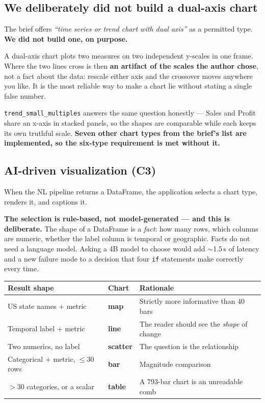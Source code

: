 \documentclass[11pt,a4paper]{article}
\begin{document}
\subsection{We deliberately did not build a dual-axis chart}
\label{sec:dual}

The brief offers \emph{``time series or trend chart with dual axis''} as a permitted
type. \textbf{We did not build one, on purpose.}

A dual-axis chart plots two measures on two independent y-scales in one frame. Where the
two lines cross is then \textbf{an artifact of the scales the author chose}, not a fact
about the data: rescale either axis and the crossover moves anywhere you like. It is the
most reliable way to make a chart lie without stating a single false number.

\texttt{trend\_small\_multiples} answers the same question honestly --- Sales and Profit
share an x-axis in stacked panels, so the shapes are comparable while each keeps its own
truthful scale. \textbf{Seven other chart types from the brief's list are implemented, so
the six-type requirement is met without it.}

\subsection{AI-driven visualization (C3)}

When the NL pipeline returns a DataFrame, the application selects a chart type, renders
it, and captions it.

\textbf{The selection is rule-based, not model-generated --- and this is deliberate.}
The shape of a DataFrame is a \emph{fact}: how many rows, which columns are numeric,
whether the label column is temporal or geographic. Facts do not need a language model.
Asking a 4B model to choose would add $\sim$1.5\,s of latency and a new failure mode to
a decision that four \texttt{if} statements make correctly every time.

\begin{center}
\begin{tabularx}{\textwidth}{@{}llX@{}}
\toprule
\textbf{Result shape} & \textbf{Chart} & \textbf{Rationale} \\
\midrule
US state names + metric            & \textbf{map}     & Strictly more informative than 40 bars \\
Temporal label + metric            & \textbf{line}    & The reader should see the \emph{shape} of change \\
Two numerics, no label             & \textbf{scatter} & The question is the relationship \\
Categorical + metric, $\le$30 rows & \textbf{bar}     & Magnitude comparison \\
$>$30 categories, or a scalar      & \textbf{table}   & A 793-bar chart is an unreadable comb \\
\bottomrule
\end{tabularx}
\end{center}
\end{document}

